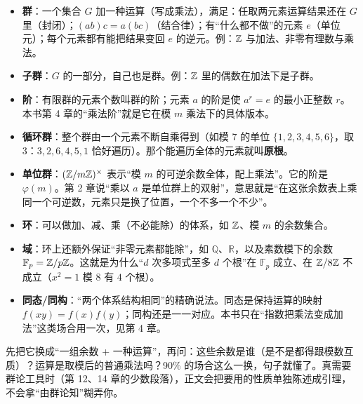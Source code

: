 \begin{itemize}
\item \textbf{群}：一个集合 $G$ 加一种运算（写成乘法），满足：任取两元素运算结果还在 $G$ 里（封闭）；$(ab)c=a(bc)$（结合律）；有“什么都不做”的元素 $e$（单位元）；每个元素都有能把结果变回 $e$ 的逆元。例：$\mathbb Z$ 与加法、非零有理数与乘法。
\item \textbf{子群}：$G$ 的一部分，自己也是群。例：$\mathbb Z$ 里的偶数在加法下是子群。
\item \textbf{阶}：有限群的元素个数叫群的阶；元素 $a$ 的阶是使 $a^r=e$ 的最小正整数 $r$。本书第 4 章的“乘法阶”就是它在模 $m$ 乘法下的具体版本。
\item \textbf{循环群}：整个群由一个元素不断自乘得到（如模 $7$ 的单位 $\{1,2,3,4,5,6\}$，取 $3$：$3,2,6,4,5,1$ 恰好遍历）。那个能遍历全体的元素就叫\textbf{原根}。
\item \textbf{单位群}：$(\mathbb Z/m\mathbb Z)^{\times}$ 表示“模 $m$ 的可逆余数全体，配上乘法”。它的阶是 $\varphi(m)$。第 2 章说“乘以 $a$ 是单位群上的双射”，意思就是“在这张余数表上乘同一个可逆数，元素只是换了位置，一个不多一个不少”。
\item \textbf{环}：可以做加、减、乘（不必能除）的体系，如 $\mathbb Z$、模 $m$ 的余数集合。
\item \textbf{域}：环上还额外保证“非零元素都能除”，如 $\mathbb Q$、$\mathbb R$，以及素数模下的余数 $\mathbb F_p=\mathbb Z/p\mathbb Z$。这就是为什么“$d$ 次多项式至多 $d$ 个根”在 $\mathbb F_p$ 成立、在 $\mathbb Z/8\mathbb Z$ 不成立（$x^2=1$ 模 $8$ 有 $4$ 个根）。
\item \textbf{同态/同构}：“两个体系结构相同”的精确说法。同态是保持运算的映射 $f(xy)=f(x)f(y)$；同构还是一一对应。本书只在“指数把乘法变成加法”这类场合用一次，见第 4 章。
\end{itemize}

\begin{tip}[遇到“群”字时的实用策略]
先把它换成“一组余数 + 一种运算”，再问：这些余数是谁（是不是都得跟模数互质）？运算是取模后的普通乘法吗？90\% 的场合这么一换，句子就懂了。真需要群论工具时（第 12、14 章的少数段落），正文会把要用的性质单独陈述成引理，不会拿“由群论知”糊弄你。
\end{tip}

